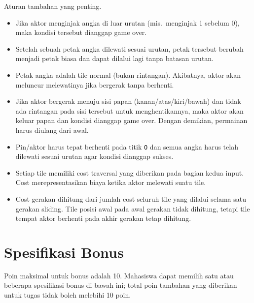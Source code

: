 \noindent
Aturan tambahan yang penting.
\begin{itemize}
    \item Jika aktor menginjak angka di luar urutan (mis.\, menginjak 1 sebelum 0), maka kondisi tersebut dianggap game over.
    \item Setelah sebuah petak angka dilewati sesuai urutan, petak tersebut berubah menjadi petak biasa dan dapat dilalui lagi tanpa batasan urutan.
    \item Petak angka adalah tile normal (bukan rintangan). Akibatnya, aktor akan meluncur melewatinya jika bergerak tanpa berhenti.
    \item Jika aktor bergerak menuju sisi papan (kanan/atas/kiri/bawah) dan tidak ada rintangan pada sisi tersebut untuk menghentikannya, maka aktor akan keluar papan dan kondisi dianggap game over. Dengan demikian, permainan harus diulang dari awal.
    \item Pin/aktor harus tepat berhenti pada titik \texttt{O} dan semua angka harus telah dilewati sesuai urutan agar kondisi dianggap sukses.
    \item Setiap tile memiliki cost traversal yang diberikan pada bagian kedua input. Cost merepresentasikan biaya ketika aktor melewati suatu tile.
    \item Cost gerakan dihitung dari jumlah cost seluruh tile yang dilalui selama satu gerakan sliding. Tile posisi awal pada awal gerakan tidak dihitung, tetapi tile tempat aktor berhenti pada akhir gerakan tetap dihitung.
\end{itemize}

\section{Spesifikasi Bonus}

Poin maksimal untuk bonus adalah 10. Mahasiswa dapat memilih satu atau beberapa spesifikasi bonus di bawah ini; total poin tambahan yang diberikan untuk tugas tidak boleh melebihi 10 poin.

